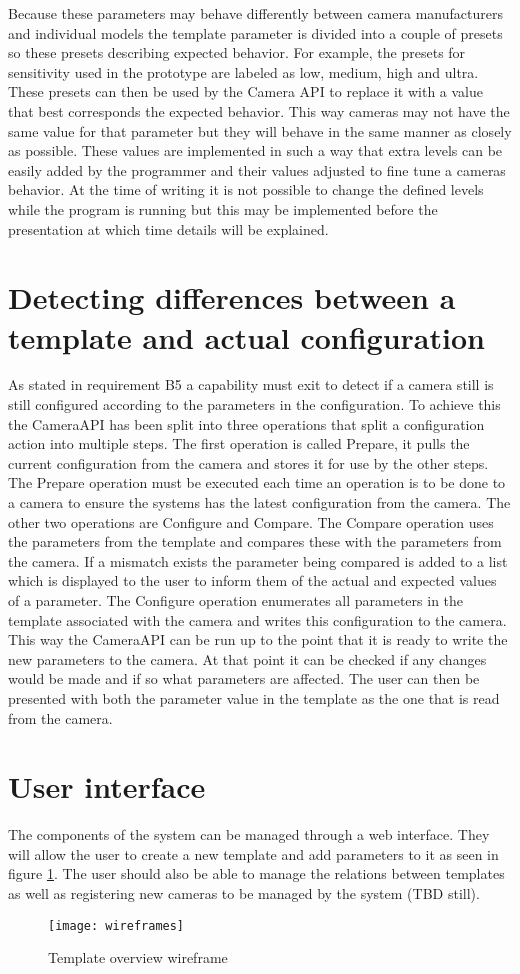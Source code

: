 Because these parameters may behave differently between camera manufacturers and individual models the template parameter is divided into a couple of presets so these presets describing expected behavior.
For example, the presets for sensitivity used in the prototype are labeled as low, medium, high and ultra.
These presets can then be used by the Camera API to replace it with a value that best corresponds the expected behavior.
This way cameras may not have the same value for that parameter but they will behave in the same manner as closely as possible.
These values are implemented in such a way that extra levels can be easily added by the programmer and their values adjusted to fine tune a cameras behavior.
At the time of writing it is not possible to change the defined levels while the program is running but this may be implemented before the presentation at which time details will be explained.

\section{Detecting differences between a template and actual configuration}
As stated in requirement B5 a capability must exit to detect if a camera still is still configured according to the parameters in the configuration.
To achieve this the CameraAPI has been split into three operations that split a configuration action into multiple steps.
The first operation is called Prepare, it pulls the current configuration from the camera and stores it for use by the other steps.
The Prepare operation must be executed each time an operation is to be done to a camera to ensure the systems has the latest configuration from the camera.
The other two operations are Configure and Compare.
The Compare operation uses the parameters from the template and compares these with the parameters from the camera.
If a mismatch exists the parameter being compared is added to a list which is displayed to the user to inform them of the actual and expected values of a parameter.
The Configure operation enumerates all parameters in the template associated with the camera and writes this configuration to the camera.
This way the CameraAPI can be run up to the point that it is ready to write the new parameters to the camera.
At that point it can be checked if any changes would be made and if so what parameters are affected.
The user can then be presented with both the parameter value in the template as the one that is read from the camera.

\section{User interface}
The components of the system can be managed through a web interface.
They will allow the user to create a new template and add parameters to it as seen in figure \ref{fig:templatewireframe}.
The user should also be able to manage the relations between templates as well as registering new cameras to be managed by the system (TBD still).
\begin{figure}[h!]
	\centering
	\texttt{[image: wireframes]}
	\caption{Template overview  wireframe}
	\label{fig:templatewireframe}
\end{figure}

